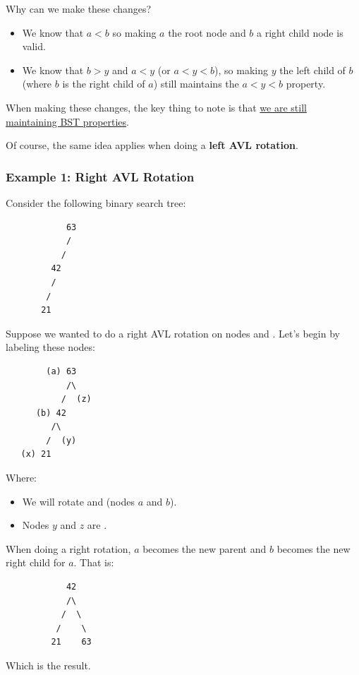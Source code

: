 \documentclass[letterpaper]{article}
\begin{document}
Why can we make these changes? 
\begin{itemize}
    \item We know that $a < b$ so making $a$ the root node and $b$ a right child node is valid. 
    \item We know that $b > y$ and $a < y$ (or $a < y < b$), so making $y$ the left child of $b$ (where $b$ is the right child of $a$) still maintains the $a < y < b$ property. 
\end{itemize}
When making these changes, the key thing to note is that \underline{we are still maintaining BST properties}. 

\bigskip 

Of course, the same idea applies when doing a \textbf{left AVL rotation}. 

\subsubsection{Example 1: Right AVL Rotation}
Consider the following binary search tree: 
\begin{verbatim}
            63
            /
           /
         42
         /
        /
       21
\end{verbatim}
Suppose we wanted to do a right AVL rotation on nodes  and . Let's begin by labeling these nodes: 
\begin{verbatim}
        (a) 63 
            /\
           /  (z)
      (b) 42
         /\
        /  (y)
   (x) 21
\end{verbatim}
Where: 
\begin{itemize}
    \item We will rotate  and  (nodes $a$ and $b$).
    \item Nodes $y$ and $z$ are . 
\end{itemize}
When doing a right rotation, $a$ becomes the new parent and $b$ becomes the new right child for $a$. That is: 
\begin{verbatim}
            42
            /\
           /  \ 
          /    \ 
         21    63 
\end{verbatim}
Which is the result. 
\end{document}
